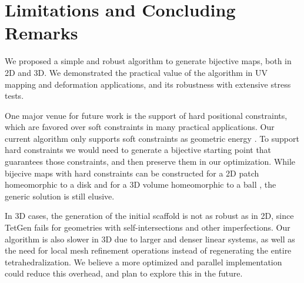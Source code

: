 \section{Limitations and Concluding Remarks}

We proposed a simple and robust algorithm to generate bijective maps, both in 2D and 3D. We demonstrated the practical value of the algorithm in UV mapping and deformation applications, and its robustness with extensive stress tests.

One major venue for future work is the support of hard positional constraints, which are favored over soft constraints in many practical applications. Our current algorithm only supports soft constraints as geometric energy \cite{Schuller:2013}. To support hard constraints we would need to generate a bijective starting point that guarantees those constraints, and then preserve them in our optimization. While bijecive maps with hard constraints can be constructed for a 2D patch homeomorphic to a disk \cite{Weber:2014} and for a 3D volume homeomorphic to a ball \cite{Campen:2016}, the generic solution is still elusive.

In 3D cases, the generation of the initial scaffold is not as robust as in 2D, since TetGen fails for geometries with self-intersections and other imperfections. Our algorithm is also slower in 3D due to larger and denser linear systems, as well as the need for local mesh refinement operations instead of regenerating the entire tetrahedralization. We believe a more optimized and parallel implementation could reduce this overhead, and plan to explore this in the future.




